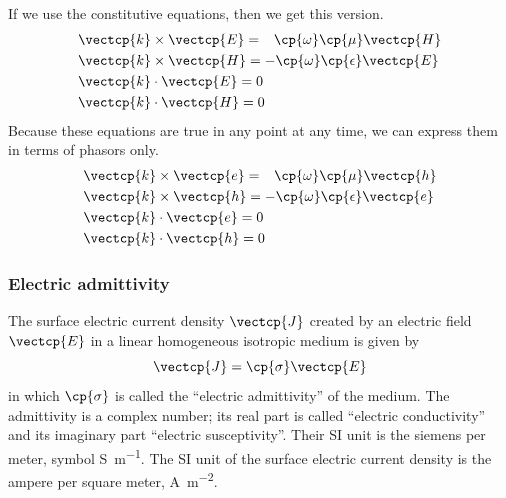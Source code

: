 If we use the constitutive equations, then we get this version.
\begin{subequations}
    \begin{align}
        &\vectcp{k} \times \vectcp{E} =
        \hphantom{\mathrel{-}}\cp{\omega} \cp{\mu} \vectcp{H} \\
        &\vectcp{k} \times \vectcp{H} =
        -\cp{\omega} \cp{\epsilon} \vectcp{E} \\
        &\vectcp{k} \cdot  \vectcp{E} = 0 \\
        &\vectcp{k} \cdot  \vectcp{H} = 0
    \end{align}
\end{subequations}
Because these equations are true in any point at any time, we can express them in terms of phasors only.
\begin{subequations}
    \begin{align}
        &\vectcp{k} \times \vectcp{e} =
        \hphantom{\mathrel{-}}\cp{\omega} \cp{\mu} \vectcp{h}
        \label{eq:maxwell_k_cross_e_phasor}
        \\
        &\vectcp{k} \times \vectcp{h} =
        -\cp{\omega} \cp{\epsilon} \vectcp{e}
        \label{eq:maxwell_k_cross_h_phasor}
        \\
        &\vectcp{k} \cdot  \vectcp{e} = 0
        \label{eq:maxwell_k_dot_e_phasor}
        \\
        &\vectcp{k} \cdot  \vectcp{h} = 0
        \label{eq:maxwell_k_dot_h_phasor}
    \end{align}
\end{subequations}

\subsubsection{Electric admittivity}
The surface electric current density $\vectcp{J}$ created by an electric field~$\vectcp{E}$ in a linear homogeneous isotropic medium is given by
\begin{equation}
    \vectcp{J} = \cp{\sigma} \vectcp{E}
\end{equation}
in which $\cp{\sigma}$ is called the ``electric admittivity'' of the medium.
The admittivity is a complex number;
its real part is called ``electric conductivity'' and its imaginary part ``electric susceptivity''.
Their SI unit is the siemens per meter, symbol \si{\siemens\per\meter}.
The SI unit of the surface electric current density is the ampere per square meter, \si{\ampere\per\meter\squared}.

